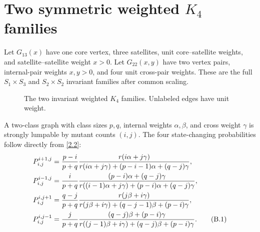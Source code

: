\section{Two symmetric weighted \texorpdfstring{$K_4$}{K4} families}\label{app:k4}

Let $G_{13}(x)$ have one core vertex, three satellites, unit
core--satellite weights, and satellite--satellite weight $x>0$.  Let
$G_{22}(x,y)$ have two vertex pairs, internal-pair weights $x,y>0$, and four
unit cross-pair weights.  These are the full $S_1\times S_3$ and
$S_2\times S_2$ invariant families after common scaling.

\begin{figure}[ht]
\centering
{}
\caption{The two invariant weighted $K_4$ families.  Unlabeled edges have
unit weight.}
\label{fig:k4}
\end{figure}

A two-class graph with class sizes $p,q$, internal weights $\alpha,\beta$,
and cross weight $\gamma$ is strongly lumpable by mutant counts $(i,j)$.
The four state-changing probabilities follow directly from \eqref{2.2}:
\begin{align}
 P_{i,j}^{i+1,j}
 &=\frac{p-i}{p+q}\frac{r(i\alpha+j\gamma)}
 {r(i\alpha+j\gamma)+(p-i-1)\alpha+(q-j)\gamma},\notag\\
 P_{i,j}^{i-1,j}
 &=\frac{i}{p+q}\frac{(p-i)\alpha+(q-j)\gamma}
 {r((i-1)\alpha+j\gamma)+(p-i)\alpha+(q-j)\gamma},\notag\\
 P_{i,j}^{i,j+1}
 &=\frac{q-j}{p+q}\frac{r(j\beta+i\gamma)}
 {r(j\beta+i\gamma)+(q-j-1)\beta+(p-i)\gamma},\notag\\
 P_{i,j}^{i,j-1}
 &=\frac{j}{p+q}\frac{(q-j)\beta+(p-i)\gamma}
 {r((j-1)\beta+i\gamma)+(q-j)\beta+(p-i)\gamma}.
                                                               \tag{B.1}\label{B.1}
\end{align}


